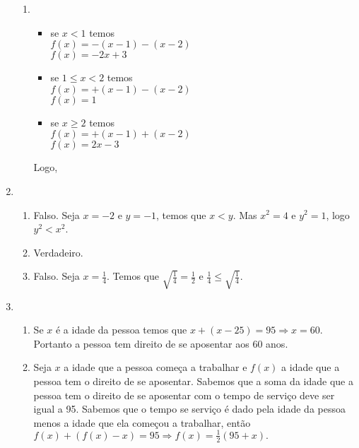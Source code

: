 \documentclass[12pt]{article}
\begin{document}
\begin{enumerate}
\begin{enumerate}
 \item 
  \begin{itemize}
  \item se $x<1$ temos\\
  $f(x)=-(x-1)-(x-2)$\\
  $f(x)=-2x+3$\\
  \item se $1\leq x<2$ temos\\
  $f(x)=+(x-1)-(x-2)$\\
  $f(x)=1$
  \item se $x\geq2$ temos\\
  $f(x)=+(x-1)+(x-2)$\\
  $f(x)=2x-3$\\
  \end{itemize}
 Logo,\\

  \begin{comment}
  $
  f(x) = \left\{
  \begin{array}{rcl}
  -2x+31,& \mbox{se} & x<1\\
  1, & \mbox{se} & 1\leqx<2\\
  2x-3, & \mbox{se} & x\geq 2
  \end{array}
  \right.
  $\\
  \end{comment}
 \end{enumerate}

\item
 \begin{enumerate}
 \item Falso. Seja $x=-2$ e $y=-1$, temos que $x<y$. Mas $x^2=4$ e $y^2=1$, logo $y^2<x^2$.
 \item Verdadeiro.
 \item Falso. Seja $x=\frac{1}{4}$. Temos que $\sqrt{\frac{1}{4}}=\frac{1}{2}$ e $\frac{1}{4}\leq\sqrt{\frac{1}{4}}$.
 \end{enumerate}


\item
 \begin{enumerate}
 \item Se $x$ é a idade da pessoa temos que $x+(x-25)=95\Rightarrow x=60$. Portanto a pessoa tem direito de se aposentar aos $60$ anos.
 \item Seja $x$ a idade que a pessoa começa a trabalhar e $f(x)$ a idade que a pessoa tem o direito de se aposentar. Sabemos que a soma da idade que a pessoa tem o direito de se aposentar com o tempo de serviço deve ser igual a 95.
 Sabemos que o tempo se serviço é dado pela idade da pessoa menos a idade que ela começou a trabalhar, então $f(x)+(f(x)-x)=95\Rightarrow f(x)=\frac{1}{2}(95+x).$
 \end{enumerate}
\end{enumerate}
\end{document}
